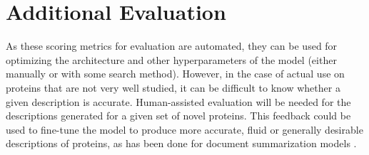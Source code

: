 \documentclass{specification}
\begin{document}
\section*{Additional Evaluation}
As these scoring metrics for evaluation are automated, they can be used for optimizing the architecture and other hyperparameters of the model (either manually or with some search method). However, in the case of actual use on proteins that are not very well studied, it can be difficult to know whether a given description is accurate. Human-assisted evaluation will be needed for the descriptions generated for a given set of novel proteins. This feedback could be used to fine-tune the model to produce more accurate, fluid or generally desirable descriptions of proteins, as has been done for document summarization models \cite{finetuningWithHuman, learningToSummarize}.

\printbibliography
\end{document}
